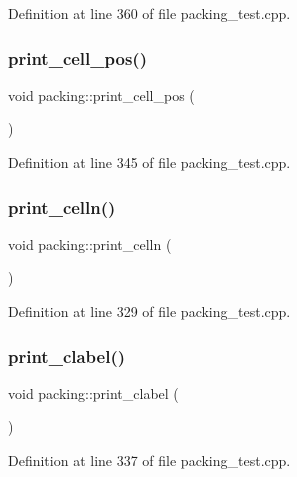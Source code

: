 Definition at line 360 of file packing\+\_\+test.\+cpp.

\mbox{\label{classpacking_a1dfafb1273eef9839012796f8f674cd3}} 
\subsubsection{\texorpdfstring{print\+\_\+cell\+\_\+pos()}{print\_cell\_pos()}}
{\footnotesize\ttfamily void packing\+::print\+\_\+cell\+\_\+pos (\begin{DoxyParamCaption}{ }\end{DoxyParamCaption})}



Definition at line 345 of file packing\+\_\+test.\+cpp.

\mbox{\label{classpacking_a874b2bf73b23b4e051c293f68e25e6c9}} 
\subsubsection{\texorpdfstring{print\+\_\+celln()}{print\_celln()}}
{\footnotesize\ttfamily void packing\+::print\+\_\+celln (\begin{DoxyParamCaption}{ }\end{DoxyParamCaption})}



Definition at line 329 of file packing\+\_\+test.\+cpp.

\mbox{\label{classpacking_ac064578aca74b4916463599a9fbdf2af}} 
\subsubsection{\texorpdfstring{print\+\_\+clabel()}{print\_clabel()}}
{\footnotesize\ttfamily void packing\+::print\+\_\+clabel (\begin{DoxyParamCaption}{ }\end{DoxyParamCaption})}



Definition at line 337 of file packing\+\_\+test.\+cpp.


